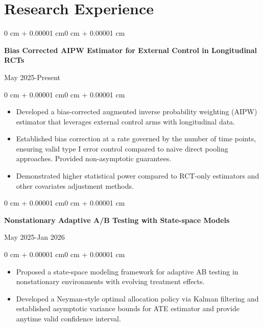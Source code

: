 \documentclass[10pt, letterpaper]{article}
\newenvironment{highlights}{
    \begin{itemize}[
        topsep=0.10 cm,
        parsep=0.10 cm,
        partopsep=0pt,
        itemsep=0pt,
        leftmargin=0 cm + 10pt
    ]
}{\end{itemize}}
\newenvironment{onecolentry}{
    \begin{adjustwidth}{0 cm + 0.00001 cm}{0 cm + 0.00001 cm}
}{\end{adjustwidth}}
\newenvironment{twocolentry}[2][]{
    \onecolentry
    \def\secondColumn{#2}
    \noindent\begin{minipage}[t]{\dimexpr\linewidth-4.7cm\relax}
}{
    \end{minipage}\hfill
    \begin{minipage}[t]{4.5cm}
        \raggedleft \secondColumn
    \end{minipage}
    \endonecolentry
}
\begin{document}
\vspace{0.10 cm}

\section{Research Experience}

\begin{twocolentry}{May 2025-Present}
    \textbf{Bias Corrected AIPW Estimator for External Control in Longitudinal RCTs}\\
\end{twocolentry}
\vspace{0.05 cm}
\begin{onecolentry}
    \begin{highlights}
        \item Developed a bias-corrected augmented inverse probability weighting (AIPW) estimator that leverages external control arms with longitudinal data.  
        \item Established bias correction at a rate governed by the number of time points, ensuring valid type I error control compared to naive direct pooling approaches. Provided non-asymptotic guarantees.
        \item Demonstrated higher statistical power compared to RCT-only estimators and other covariates adjustment methods.
    \end{highlights}
\end{onecolentry}
\vspace{0.10 cm}
\begin{twocolentry}{May 2025-Jan 2026}
    \textbf{Nonstationary Adaptive A/B Testing with State-space Models}\\
\end{twocolentry}
\vspace{0.05 cm}
\begin{onecolentry}
    \begin{highlights}
        \item Proposed a state-space modeling framework for adaptive AB testing in nonstationary environments with evolving treatment effects.
        \item Developed a Neyman-style optimal allocation policy via Kalman filtering and established asymptotic variance bounds for  ATE estimator and provide anytime valid confidence interval.
    \end{highlights}
\end{onecolentry}
\vspace{0.10 cm}
\end{document}
